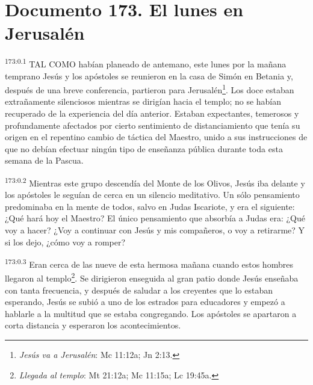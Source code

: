 \chapter{Documento 173. El lunes en Jerusalén}
\par 
\textsuperscript{173:0.1} TAL COMO habían planeado de antemano, este lunes por la mañana temprano Jesús y los apóstoles se reunieron en la casa de Simón en Betania y, después de una breve conferencia, partieron para Jerusalén\footnote{\textit{Jesús va a Jerusalén}: Mc 11:12a; Jn 2:13.}. Los doce estaban extrañamente silenciosos mientras se dirigían hacia el templo; no se habían recuperado de la experiencia del día anterior. Estaban expectantes, temerosos y profundamente afectados por cierto sentimiento de distanciamiento que tenía su origen en el repentino cambio de táctica del Maestro, unido a sus instrucciones de que no debían efectuar ningún tipo de enseñanza pública durante toda esta semana de la Pascua.

\par 
\textsuperscript{173:0.2} Mientras este grupo descendía del Monte de los Olivos, Jesús iba delante y los apóstoles le seguían de cerca en un silencio meditativo. Un sólo pensamiento predominaba en la mente de todos, salvo en Judas Iscariote, y era el siguiente: ¿Qué hará hoy el Maestro? El único pensamiento que absorbía a Judas era: ¿Qué voy a hacer? ¿Voy a continuar con Jesús y mis compañeros, o voy a retirarme? Y si los dejo, ¿cómo voy a romper?

\par 
\textsuperscript{173:0.3} Eran cerca de las nueve de esta hermosa mañana cuando estos hombres llegaron al templo\footnote{\textit{Llegada al templo}: Mt 21:12a; Mc 11:15a; Lc 19:45a.}. Se dirigieron enseguida al gran patio donde Jesús enseñaba con tanta frecuencia, y después de saludar a los creyentes que lo estaban esperando, Jesús se subió a uno de los estrados para educadores y empezó a hablarle a la multitud que se estaba congregando. Los apóstoles se apartaron a corta distancia y esperaron los acontecimientos.

